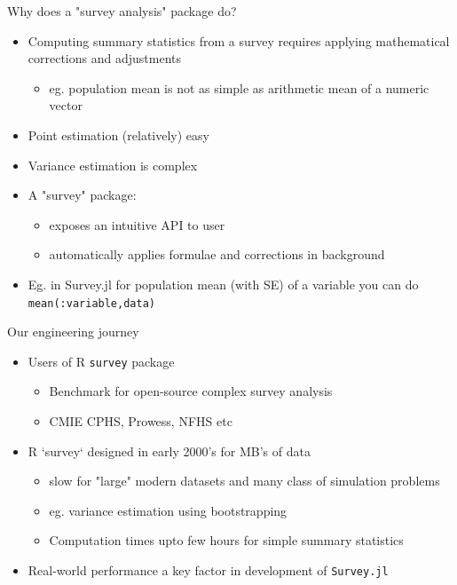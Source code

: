\documentclass{beamer}          %
\begin{document}
\begin{frame}{Why does a "survey analysis" package do?}  
	\begin{itemize}
	\item Computing summary statistics from a survey requires  applying mathematical corrections and adjustments
  	\begin{itemize}
  		\item eg. population mean is not as simple as arithmetic mean of a numeric vector
  	\end{itemize}
  	\item Point estimation (relatively) easy
  	\item Variance estimation is complex
  	\item A "survey" package:
  	\begin{itemize}
  		\item exposes an intuitive API to user
  		\item automatically applies formulae and corrections in background
  	\end{itemize}
  	\item Eg. in Survey.jl for population mean (with SE) of a variable you can do \texttt{mean(:variable,data)}
	\end{itemize}
\end{frame}

\begin{frame}{Our engineering journey}
\begin{itemize}
  \item Users of R \texttt{survey} package
  	\begin{itemize}
  		\item Benchmark for open-source complex survey analysis
  		\item CMIE CPHS, Prowess, NFHS etc
  	\end{itemize}	
  \item R `survey` designed in early 2000's for MB's of data 
	\begin{itemize}
  		\item slow for "large" modern datasets and many class of simulation problems
  		\item eg. variance estimation using bootstrapping
  		\item Computation times upto few hours for simple summary statistics
   	\end{itemize}
   	\item Real-world performance a key factor in development of \texttt{Survey.jl}
\end{itemize}
\end{frame}
\end{document}
